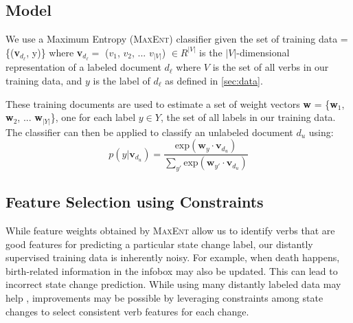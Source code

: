

\subsection{Model}
We use a Maximum Entropy (\textsc{MaxEnt}) classifier given the set of training data = \{(\textbf{v}$_{d_{\ell}}$, y)\} where \textbf{v}$_{d_{\ell}} =$ ($v_1$, $v_2$, ... $v_{|V|}$) $\in R^{|V|}$ is the $|V|$-dimensional representation of a labeled document $d_{\ell}$ where $V$ is the set of all verbs in our training data, and $y$ is the label of $d_{\ell}$ as defined in \ref{sec:data}.

These training documents are used to estimate a set of weight vectors \textbf{w} = \{\textbf{w}$_1$, \textbf{w}$_2$, ... \textbf{w}$_{|Y|}$\}, one for each label $y \in Y$, the set of all labels in our training data. The classifier can then be applied to classify an unlabeled document $d_{\textit{u}}$ using: 
\scriptsize
 \begin{equation}
	p(y|\textbf{v}_{d_{\textit{u}}}) = \frac{\mathrm{exp}  (\textbf{w}_{y} \cdot \textbf{v}_{d_{\textit{u}}})}{\sum_{y'} \mathrm{exp} (\textbf{w}_{y'} \cdot \textbf{v}_{d_{\textit{u}}})} \label{eqn:maxent}
\end{equation}
\normalsize
\subsection{Feature Selection using Constraints}

While feature weights obtained by \textsc{MaxEnt} allow us to identify verbs that are good features for predicting a particular state change label, our distantly supervised training data is inherently noisy. %
For example, when death happens, birth-related information in the infobox may also be updated. This can lead to incorrect state change prediction. While using many distantly labeled data may help%
, improvements may be possible by leveraging constraints among state changes to select consistent verb features for each change. 

